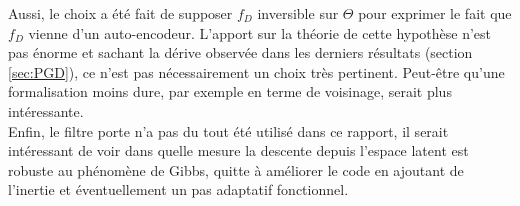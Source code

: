 \documentclass[hidelinks, french]{article} %
\theoremstyle{enonce}
\theoremstyle{special}
\theoremstyle{rq}
\theoremstyle{exo}
\theoremstyle{demo}
\begin{document}
Aussi, le choix a été fait de supposer $f_D$ inversible sur $\Theta$ pour exprimer le fait que $f_D$ vienne d'un auto-encodeur. L'apport sur la théorie de cette hypothèse n'est pas énorme et sachant la dérive observée dans les derniers résultats (section \ref{sec:PGD}), ce n'est pas nécessairement un choix très pertinent. Peut-être qu'une formalisation moins dure, par exemple en terme de voisinage, serait plus intéressante.
\\
Enfin, le filtre porte n'a pas du tout été utilisé dans ce rapport, il serait intéressant de voir dans quelle mesure la descente depuis l'espace latent est robuste au phénomène de Gibbs, quitte à améliorer le code en ajoutant de l’inertie et éventuellement un pas adaptatif fonctionnel.




\newpage
\end{document}
